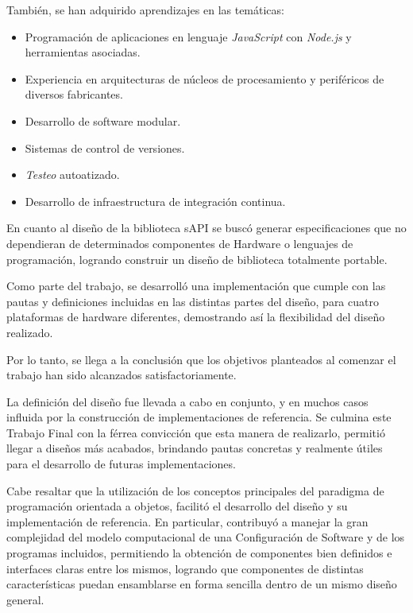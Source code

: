 
También, se han adquirido aprendizajes en las temáticas:

\begin{itemize}
\item
Programación de aplicaciones en lenguaje \emph{JavaScript} con \emph{Node.js} y herramientas asociadas.
\item
Experiencia en arquitecturas de núcleos de procesamiento y periféricos de diversos fabricantes.
\item
Desarrollo de software modular.
\item
Sistemas de control de versiones.
\item
\emph{Testeo} autoatizado. 
\item
Desarrollo de infraestructura de integración continua.
\end{itemize}


En cuanto al diseño de la biblioteca sAPI se buscó generar especificaciones que no dependieran de determinados componentes de Hardware o lenguajes de programación, logrando construir un diseño de biblioteca totalmente portable.

Como parte del trabajo, se desarrolló una implementación que cumple con las pautas y definiciones incluidas en las distintas partes del diseño, para cuatro plataformas de hardware diferentes, demostrando así la flexibilidad del diseño realizado.

Por lo tanto, se llega a la conclusión que los objetivos planteados al comenzar el trabajo han sido alcanzados satisfactoriamente.

La definición del diseño fue llevada a cabo en conjunto, y en muchos casos influida por la construcción de implementaciones de referencia. Se culmina este Trabajo Final con la férrea convicción que esta manera de realizarlo, permitió llegar a diseños más acabados, brindando pautas concretas y realmente útiles para el desarrollo de futuras implementaciones.


%

Cabe resaltar que la utilización de los conceptos principales del paradigma de programación orientada a objetos, facilitó el desarrollo del diseño y su implementación de referencia. 
En particular, contribuyó a manejar la gran complejidad del modelo computacional de una Configuración de Software y de los programas incluidos, permitiendo la obtención de componentes bien definidos e interfaces claras entre los mismos, logrando que componentes de distintas características puedan ensamblarse en forma sencilla dentro de un mismo diseño general.

